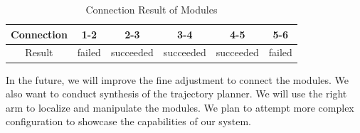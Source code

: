 \begin{table}[h]
\caption{Connection Result of Modules} %
\begin{tabular}{|c |c |c |c |c |c|}
\hline
 Connection &  1-2 & 2-3 & 3-4 & 4-5 & 5-6 \\\hline 
  Result  & failed & succeeded & succeeded & succeeded & failed \\\hline  
\end{tabular}\label{table:result}
\end{table}

In the future, we will improve the fine adjustment to connect the modules. We also want to conduct synthesis of the trajectory planner. We will use the right arm to localize and manipulate the modules. We plan to attempt more complex configuration to showcase the capabilities of our system.


